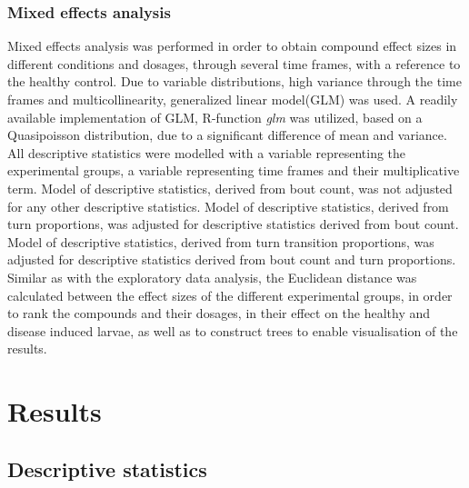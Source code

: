 \documentclass[a4paper,12pt]{article}
\begin{document}
\subsubsection{Mixed effects analysis}
Mixed effects analysis was performed in order to obtain compound effect sizes in different conditions and dosages, through several time frames, with a reference to the healthy control. Due to variable distributions, high variance through the time frames and multicollinearity, generalized linear model(GLM) was used. A readily available implementation of GLM, R-function \textit{glm} was utilized, based on a Quasipoisson distribution, due to a significant difference of mean and variance. \\All descriptive statistics were modelled with a variable representing the experimental groups, a variable representing time frames and their multiplicative term. Model of descriptive statistics, derived from bout count, was not adjusted for any other descriptive statistics. Model of descriptive statistics, derived from turn proportions, was adjusted for descriptive statistics derived from bout count. Model of descriptive statistics, derived from turn transition proportions, was adjusted for descriptive statistics derived from bout count and turn proportions. 
\\Similar as with the exploratory data analysis, the Euclidean distance was calculated between the effect sizes of the different experimental groups, in order to rank the compounds and their dosages, in their effect on the healthy and disease induced larvae, as well as to construct trees to enable visualisation of the results.
\section{Results}
\subsection{Descriptive statistics}
\end{document}
